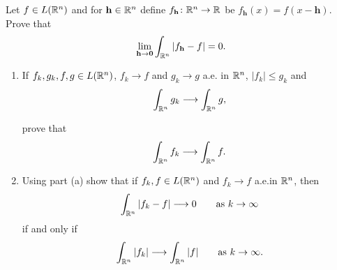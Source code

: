 \begin{problem}
  Let \(f\in L(\mathbb{R}^n)\) and for \(\mathbf{h}\in\mathbb{R}^n\) define
  \(f_{\mathbf{h}}\colon\mathbb{R}^n\to\mathbb{R}\) be
  \(f_{\mathbf{h}}( x )= f( x -\mathbf{h})\). Prove that
  \[
    \lim_{\mathbf{h}\to\mathbf{0}}\int_{\mathbb{R}^n}\left|f_{\mathbf{h}}-f\right|=0.
  \]
\end{problem}
\begin{solution}
\end{solution}

\begin{problem}
\begin{enumerate}[label=(\alph*)]
\item If \(f_k,g_k,f,g\in L(\mathbb{R}^n)\), \(f_k\to f\) and \(g_k\to g\) a.e.\@
  in \(\mathbb{R}^n\), \(|f_k|\leq g_k\) and
  \[
    \int_{\mathbb{R}^n}g_k\longrightarrow\int_{\mathbb{R}^n}g,
  \]

  prove that
  \[
    \int_{\mathbb{R}^n} f_k\longrightarrow\int_{\mathbb{R}^n}f.
  \]
\item Using part (a) show that if \(f_k,f\in L(\mathbb{R}^n)\) and \(f_k\to f\)
  a.e.\@ in \(\mathbb{R}^n\), then
  \[
    \int_{\mathbb{R}^n}|f_k-f|\longrightarrow 0\qquad\text{as \(k\to\infty\)}
  \]
  if and only if
  \[
    \int_{\mathbb{R}^n}|f_k|\longrightarrow\int_{\mathbb{R}^n}|f|\qquad\text{as
      \(k\to\infty\)}.
  \]
\end{enumerate}
\end{problem}
\begin{solution}
\end{solution}

